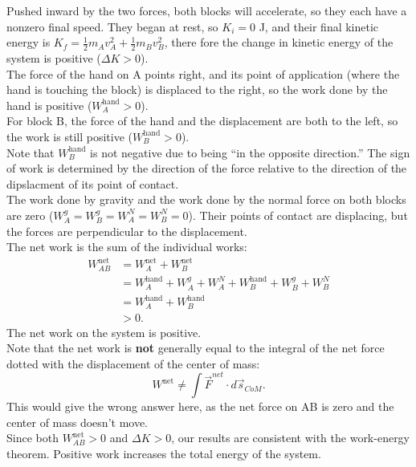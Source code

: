 \documentclass[]{article}
\begin{document}
\newpage
\begin{TeacherMargin}
\noindent Pushed inward by the two forces, both blocks will accelerate, so they each have a nonzero final speed. They began at rest, so $K_{i} = 0$ J, and their final kinetic energy is $K_{f} = \frac{1}{2}m_{A}v_{A}^{2} + \frac{1}{2}m_{B}v_{B}^{2}$, there fore the change in kinetic energy of the system is positive ($\Delta K > 0$). \\

\noindent The force of the hand on A points right, and its point of application (where the hand is touching the block) is displaced to the right, so the work done by the hand is positive ($W_{A}^{\text{hand}}>0$). \\
For block B, the force of the hand and the displacement are both to the left, so the work is still positive ($W_{B}^{\text{hand}}>0$). \\
Note that $W_{B}^{\text{hand}}$ is not negative due to being ``in the opposite direction.'' The sign of work is determined by the direction of the force relative to the direction of the dipslacment of its point of contact. \\

\noindent The work done by gravity and the work done by the normal force on both blocks are zero ($W_{A}^{g} = W_{B}^{g} = W_{A}^{N} = W_{B}^{N}=0$). Their points of contact are displacing, but the forces are perpendicular to the displacement. \\

\noindent The net work is the sum of the individual works:
\begin{align*}
	W_{AB}^{\text{net}} & = W_{A}^{\text{net}} + W_{B}^{\text{net}} \\
	& = W_{A}^{\text{hand}} + W_{A}^{g} + W_{A}^{N} + W_{B}^{\text{hand}} + W_{B}^{g} + W_{B}^{N} \\
	& = W_{A}^{\text{hand}} + W_{B}^{\text{hand}} \\
	& > 0.
\end{align*}
The net work on the system is positive. \\
Note that the net work is \textbf{not} generally equal to the integral of the net force dotted with the displacement of the center of mass:
\[
W^{\text{net}} \neq \int\vec{F}^{net}\cdot d\vec{s}_{CoM}.
\]
This would give the wrong answer here, as the net force on AB is zero and the center of mass doesn't move. \\

\noindent Since both $W_{AB}^{\text{net}}>0$ and $\Delta K > 0$, our results are consistent with the work-energy theorem. Positive work increases the total energy of the system.
\end{TeacherMargin}
\end{document}
